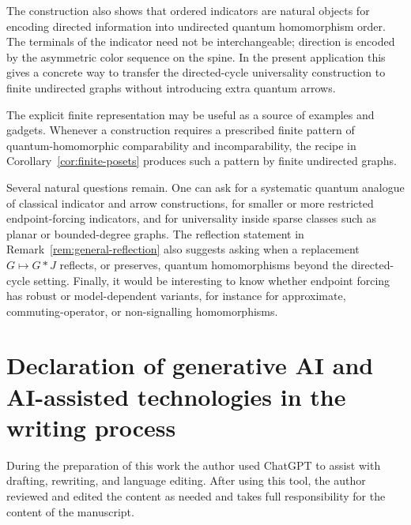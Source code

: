 \documentclass[11pt]{amsart}
\theoremstyle{plain}
\theoremstyle{definition}
\begin{document}
The construction also shows that ordered indicators are natural objects for encoding directed information into undirected quantum homomorphism order.  The terminals of the indicator need not be interchangeable; direction is encoded by the asymmetric color sequence on the spine.  In the present application this gives a concrete way to transfer the directed-cycle universality construction to finite undirected graphs without introducing extra quantum arrows.

The explicit finite representation may be useful as a source of examples and gadgets.  Whenever a construction requires a prescribed finite pattern of quantum-homomorphic comparability and incomparability, the recipe in Corollary~\ref{cor:finite-posets} produces such a pattern by finite undirected graphs.

Several natural questions remain.  One can ask for a systematic quantum analogue of classical indicator and arrow constructions, for smaller or more restricted endpoint-forcing indicators, and for universality inside sparse classes such as planar or bounded-degree graphs.  The reflection statement in Remark~\ref{rem:general-reflection} also suggests asking when a replacement $G\mapsto G*J$ reflects, or preserves, quantum homomorphisms beyond the directed-cycle setting.  Finally, it would be interesting to know whether endpoint forcing has robust or model-dependent variants, for instance for approximate, commuting-operator, or non-signalling homomorphisms.


\section*{Declaration of generative AI and AI-assisted technologies in the writing process}
During the preparation of this work the author used ChatGPT to assist with drafting, rewriting, and language editing. After using this tool, the author reviewed and edited the content as needed and takes full responsibility for the content of the manuscript.



\end{document}
